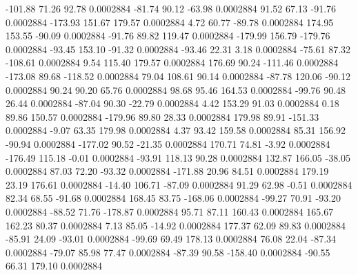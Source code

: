      -101.88       71.26       92.78     0.0002884
      -81.74       90.12      -63.98     0.0002884
       91.52       67.13      -91.76     0.0002884
     -173.93      151.67      179.57     0.0002884
        4.72       60.77      -89.78     0.0002884
      174.95      153.55      -90.09     0.0002884
      -91.76       89.82      119.47     0.0002884
     -179.99      156.79     -179.76     0.0002884
      -93.45      153.10      -91.32     0.0002884
      -93.46       22.31        3.18     0.0002884
      -75.61       87.32     -108.61     0.0002884
        9.54      115.40      179.57     0.0002884
      176.69       90.24     -111.46     0.0002884
     -173.08       89.68     -118.52     0.0002884
       79.04      108.61       90.14     0.0002884
      -87.78      120.06      -90.12     0.0002884
       90.24       90.20       65.76     0.0002884
       98.68       95.46      164.53     0.0002884
      -99.76       90.48       26.44     0.0002884
      -87.04       90.30      -22.79     0.0002884
        4.42      153.29       91.03     0.0002884
        0.18       89.86      150.57     0.0002884
     -179.96       89.80       28.33     0.0002884
      179.98       89.91     -151.33     0.0002884
       -9.07       63.35      179.98     0.0002884
        4.37       93.42      159.58     0.0002884
       85.31      156.92      -90.94     0.0002884
     -177.02       90.52      -21.35     0.0002884
      170.71       74.81       -3.92     0.0002884
     -176.49      115.18       -0.01     0.0002884
      -93.91      118.13       90.28     0.0002884
      132.87      166.05      -38.05     0.0002884
       87.03       72.20      -93.32     0.0002884
     -171.88       20.96       84.51     0.0002884
      179.19       23.19      176.61     0.0002884
      -14.40      106.71      -87.09     0.0002884
       91.29       62.98       -0.51     0.0002884
       82.34       68.55      -91.68     0.0002884
      168.45       83.75     -168.06     0.0002884
      -99.27       70.91      -93.20     0.0002884
      -88.52       71.76     -178.87     0.0002884
       95.71       87.11      160.43     0.0002884
      165.67      162.23       80.37     0.0002884
        7.13       85.05      -14.92     0.0002884
      177.37       62.09       89.83     0.0002884
      -85.91       24.09      -93.01     0.0002884
      -99.69       69.49      178.13     0.0002884
       76.08       22.04      -87.34     0.0002884
      -79.07       85.98       77.47     0.0002884
      -87.39       90.58     -158.40     0.0002884
      -90.55       66.31      179.10     0.0002884

